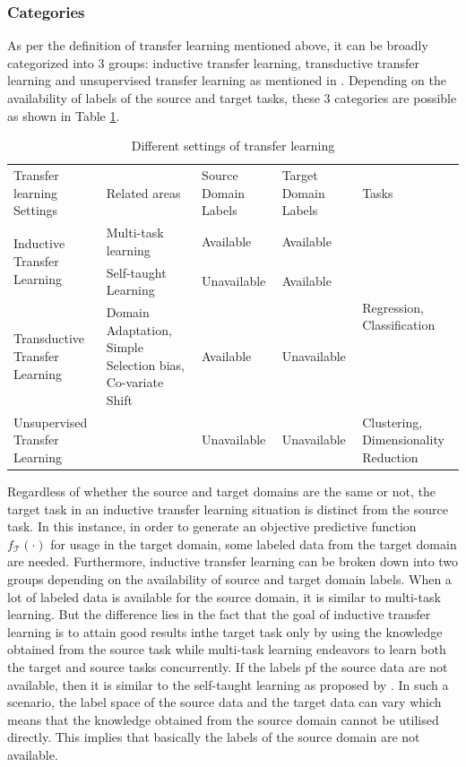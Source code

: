 \subsubsection{Categories}
As per the definition of transfer learning mentioned above, it can be broadly categorized into 3 groups: inductive transfer learning, transductive transfer learning and unsupervised transfer learning as mentioned in \cite*{pan2009survey}. Depending on the availability of labels of the source and target tasks, these 3 categories are possible as shown in Table \ref*{tab:transfer_learning}.\\
\begin{table}[t]
  \centering
  \begin{tabular}{p{1.0in}|p{1.4in}|p{1.0in}|p{1.0in}|p{0.7in}}
  \toprule
    Transfer learning Settings & Related areas & Source Domain Labels & Target Domain Labels & Tasks \\\cline{1-5}
    \multirow{2}{1.0in}{Inductive Transfer Learning} & Multi-task learning & Available & Available & \multirow{3}{0.7in}{Regression, Classification} \\\cline{2-4}
    & Self-taught Learning & Unavailable & Available \\\cline{1-4}
    Transductive Transfer Learning & Domain Adaptation, Simple Selection bias, Co-variate Shift & Available & Unavailable \\\cline{1-5}
    Unsupervised Transfer Learning &  & Unavailable & Unavailable & Clustering, Dimensionality Reduction\\  
  \bottomrule    
  \end{tabular}
  \caption{Different settings of transfer learning \cite{pan2009survey}}
  \label{tab:transfer_learning}
\end{table}
Regardless of whether the source and target domains are the same or not, the target task in an inductive transfer learning situation is distinct from the source task. In this instance, in order to generate an objective predictive function  $f_{\mathcal{T}}(\cdot)$ for usage in the target domain, some labeled data from the target domain are needed. Furthermore, inductive transfer learning can be broken down into two groups depending on the availability of source and target domain labels. When a lot of labeled data is available for the source domain, it is similar to multi-task learning. But the difference lies in the fact that the goal of inductive transfer learning is to attain good results inthe target task only by using the knowledge obtained from the source task while multi-task learning endeavors to learn both the target and source tasks concurrently\cite*{pan2009survey}. If the labels pf the source data are not available, then it is similar to the self-taught learning as proposed by \cite*{raina2007self}. In such a scenario, the label space of the source data and the target data can vary which means that the knowledge obtained from the source domain cannot be utilised directly. This implies that basically the labels of the source domain are not available.\cite*{pan2009survey}\\

